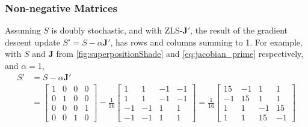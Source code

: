 \subsubsection{Non-negative Matrices}%
\label{ssub:non_negative_matrices}
Assuming $S$ is doubly stochastic, and with ZLS-$\bm{J}'$, the result of the gradient descent update $S'=S-\alpha \bm{J}'$, has rows and columns summing to 1. For example, with $S$ and $\bm{J}$  from \autoref{fig:superpositionShade} and \autoref{eq:jacobian_prime} respectively, and $\alpha=1$,
\begin{align}
    S'&=S-\alpha \bm{J}'\label{eq:alpha_magic}\\
      &=\begin{bmatrix}
          1&0&0&0\\
          0&1&0&0\\
          0&0&0&1\\
          0&0&1&0
      \end{bmatrix}-
    \frac{1}{16}
    \begin{bmatrix}
        1&1&-1&-1\\
        1&1&-1&-1\\
        -1&-1&1&1\\
        -1&-1&1&1
    \end{bmatrix}=\frac{1}{16}
    \begin{bmatrix}
        15&-1&1&1\\
        -1&15&1&1\\
        1&1&-1&15\\
        1&1&15&-1
    \end{bmatrix}
    \label{eq:superposition_prime}
\end{align}

